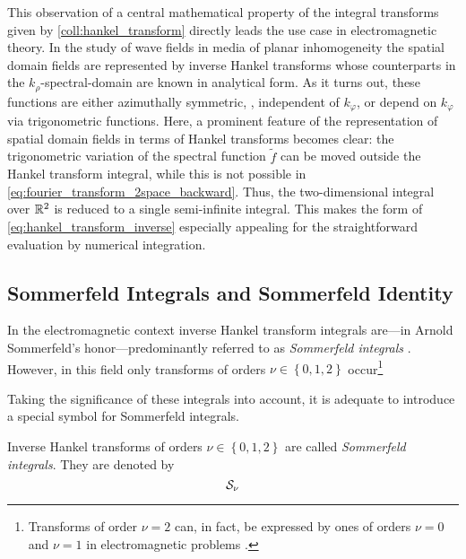 This observation of a central mathematical property of the integral transforms
given by \cref{coll:hankel_transform} directly leads the use case in
electromagnetic theory.
In the study of wave fields in media of planar inhomogeneity the spatial domain
fields are represented by inverse Hankel transforms whose counterparts in the 
$k_\rho$-spectral-domain are known in analytical form.
As it turns out, these functions are either azimuthally symmetric, \ie,
independent of $k_\varphi$, or depend on $k_\varphi$ via trigonometric
functions. 
Here, a prominent feature of the representation of spatial domain fields in
terms of Hankel transforms becomes clear: the trigonometric variation of the
spectral function $\tilde{f}$
can be moved outside the Hankel transform integral, while this is not
possible in \eqref{eq:fourier_transform_2space_backward}.
Thus, the two-dimensional integral over $\mathbb{R}^2$ is reduced to a single
semi-infinite integral.
This makes the form of \eqref{eq:hankel_transform_inverse} especially appealing
for the straightforward evaluation by numerical integration.








\subsection{Sommerfeld Integrals and Sommerfeld Identity}

In the electromagnetic context inverse Hankel transform integrals
are---in Arnold Sommerfeld's honor---predominantly referred to
as \emph{Sommerfeld integrals} \cite{Sommerfeld1909, Mosig2021}.
However, in this field only transforms of orders
$\nu \in \left\{0, 1, 2\right\}$ occur\footnote{Transforms of order $\nu = 2$
can, in fact, be expressed by ones of orders $\nu = 0$ and $\nu = 1$ in
electromagnetic problems \cite{Michalski2005}.}

Taking the significance of these integrals into account, it is adequate to
introduce a special symbol for Sommerfeld integrals.
\begin{definition}	
	Inverse Hankel transforms of orders $\nu \in \left\{0, 1, 2\right\}$
	are called \emph{Sommerfeld integrals}.
	They are denoted by
	\begin{equation}\label{eq:si_pos_real_axis_path}
		\mathcal{S}_{\nu}
	\end{equation}
\end{definition}


